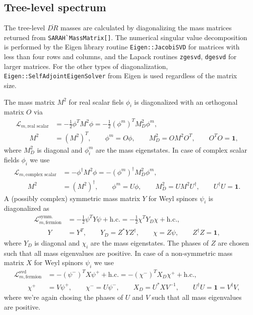 \documentclass[final,3p,times,pdflatex]{elsarticle}
\newcommand{\code}[1]{\lstinline|#1|}  %
\newcommand{\Lagr}{\mathcal{L}}
\newcommand{\unity}{\mathbf{1}}
\begin{document}
\subsection{Tree-level spectrum}
The tree-level $\overline{DR}$ masses are calculated by diagonalizing
the mass matrices returned from \code{SARAH`MassMatrix[]}.  The
numerical singular value decomposition is performed by the Eigen
library routine \code{Eigen::JacobiSVD} for matrices with less than
four rows and columns, and the Lapack routines \code{zgesvd},
\code{dgesvd} for larger matrices.  For the other types of
diagonalization, \code{Eigen::SelfAdjointEigenSolver} from Eigen is
used regardless of the matrix size.

The mass matrix $M^2$ for real scalar fiels $\phi_i$ is diagonalized
with an orthogonal matrix $O$ via
%
\begin{align}
  \Lagr_{m,\text{real scalar}}
  &= - \frac{1}{2} \phi^T M^2 \phi
  = - \frac{1}{2} (\phi^m)^T M^2_D \phi^m, \\
  \qquad M^2 &= (M^2)^T ,
  \qquad \phi^m = O \phi ,
  \qquad M^2_D = O M^2 O^T ,
  \qquad O^T O = \unity ,
\end{align}
%
where $M^2_D$ is diagonal and $\phi^m_i$ are the mass eigenstates.  In
case of complex scalar fields $\phi_i$ we use
%
\begin{align}
  \Lagr_{m,\text{complex scalar}}
  &= - \phi^\dagger M^2 \phi
  = - (\phi^m)^\dagger M^2_D \phi^m, \\
  \qquad M^2 &= (M^2)^\dagger ,
  \qquad \phi^m = U \phi ,
  \qquad M^2_D = U M^2 U^\dagger ,
  \qquad U^\dagger U = \unity .
\end{align}
%
A (possibly complex) symmetric mass matrix $Y$ for Weyl spinors
$\psi_i$ is diagonalized as
%
\begin{align}
  \Lagr_{m,\text{fermion}}^\text{symm.}
  &= - \frac{1}{2} \psi^T Y \psi + \text{h.c.}
  = - \frac{1}{2} \chi^T Y_D \chi + \text{h.c.}, \\
  \qquad Y &= Y^T ,
  \qquad Y_D = Z^* Y Z^\dagger ,
  \qquad \chi = Z \psi ,
  \qquad Z^\dagger Z = \unity ,
\end{align}
%
where $Y_D$ is diagonal and $\chi_i$ are the mass eigenstates.  The
phases of $Z$ are chosen such that all mass eigenvalues are positive.
In case of a non-symmetric mass matrix $X$ for Weyl spinors $\psi_i$
we use
%
\begin{align}
  \Lagr_{m,\text{fermion}}^\text{svd}
  &= - (\psi^-)^T X \psi^+ + \text{h.c.}
  = - (\chi^-)^T X_D \chi^+ + \text{h.c.}, \\
  \qquad \chi^+ &= V \psi^+ ,
  \qquad \chi^- = U \psi^- ,
  \qquad X_D = U^* X V^{-1} ,
  \qquad U^\dagger U = \unity = V^\dagger V ,
\end{align}
%
where we're again chosing the phases of $U$ and $V$ such that all mass
eigenvalues are positive.
\end{document}
